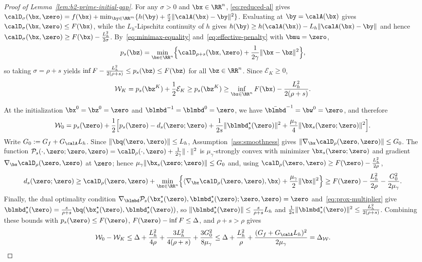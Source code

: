 \begin{proof}[Proof of Lemma~\ref{lem:b2-prime-initial-gap}]
For any \(\sigma>0\) and \(\bx\in\RR^n\), \eqref{eq:reduced-al} gives
\(\calD_\sigma(\bx,\zero)=f(\bx)+\min_{\by\in\RR^m}\{h(\by)
+\frac{\sigma}{2}\|\calA(\bx)-\by\|^2\}\). Evaluating at \(\by=\calA(\bx)\)
gives \(\calD_\sigma(\bx,\zero)\le F(\bx)\), while the \(L_h\)-Lipschitz
continuity of \(h\) gives \(h(\by)\ge h(\calA(\bx))-L_h\|\calA(\bx)-\by\|\) and
hence \(\calD_\sigma(\bx,\zero)\ge F(\bx)-\frac{L_h^2}{2\sigma}\).
By~\eqref{eq:minimax-equality} and~\eqref{eq:effective-penalty} with
\(\bmu=\zero\),
\[
    p_s(\bz)
    =\min_{\bx\in\RR^n}\Bigl\{\calD_{\rho+s}(\bx,\zero)
    +\frac{1}{2\gamma}\|\bx-\bz\|^2\Bigr\},
\]
so taking \(\sigma=\rho+s\) yields
\(\inf F-\frac{L_h^2}{2(\rho+s)}\le p_s(\bz)\le F(\bz)\) for all
\(\bz\in\RR^n\). Since \(\mathcal E_K\ge0\),
\[
    \mathcal W_K=p_s(\bz^K)+\frac12\mathcal E_K
    \ge p_s(\bz^K)
    \ge\inf_{\bx\in\RR^n}F(\bx)-\frac{L_h^2}{2(\rho+s)} .
\]

At the initialization \(\bx^0=\bz^0=\zero\) and
\(\blmbd^{-1}=\blmbd^0=\zero\), we have \(\bar{\blmbd}^{-1}=\bw^0=\zero\), and
therefore
\[
    \mathcal W_0=p_s(\zero)+\frac12\Bigl[
    p_s(\zero)-d_s(\zero;\zero)
    +\frac{1}{2s}\|\blmbd_s^\star(\zero)\|^2
    +\frac{\mu_\gamma}{4}\|\bx_s(\zero;\zero)\|^2\Bigr].
\]
Write \(G_0:=G_f+G_{\calA}L_h\). Since \(\|\bq(\zero,\zero)\|\le L_h\),
Assumption~\ref{ass:smoothness} gives
\(\|\nabla_{\bx}\calD_\rho(\zero,\zero)\|\le G_0\). The function
\(\mathcal P_s(\cdot,\zero;\zero,\zero)
=\calD_\rho(\cdot,\zero)+\frac{1}{2\gamma}\|\cdot\|^2\) is
\(\mu_\gamma\)-strongly convex with minimizer \(\bx_s(\zero;\zero)\) and
gradient \(\nabla_{\bx}\calD_\rho(\zero,\zero)\) at \(\zero\); hence
\(\mu_\gamma\|\bx_s(\zero;\zero)\|\le G_0\) and, using
\(\calD_\rho(\zero,\zero)\ge F(\zero)-\frac{L_h^2}{2\rho}\),
\[
    d_s(\zero;\zero)
    \ge\calD_\rho(\zero,\zero)
    +\min_{\bx\in\RR^n}\Bigl\{\langle\nabla_{\bx}\calD_\rho(\zero,\zero),\bx\rangle
    +\frac{\mu_\gamma}{2}\|\bx\|^2\Bigr\}
    \ge F(\zero)-\frac{L_h^2}{2\rho}-\frac{G_0^2}{2\mu_\gamma} .
\]
Finally, the dual optimality condition
\(\nabla_{\blmbd}\mathcal P_s(\bx_s^\star(\zero),\blmbd_s^\star(\zero);\zero,\zero)=\zero\)
and~\eqref{eq:prox-multiplier} give
\(\blmbd_s^\star(\zero)=\frac{s}{\rho+s}\bq(\bx_s^\star(\zero),\blmbd_s^\star(\zero))\),
so \(\|\blmbd_s^\star(\zero)\|\le\frac{s}{\rho+s}L_h\) and
\(\frac{1}{2s}\|\blmbd_s^\star(\zero)\|^2\le\frac{L_h^2}{2(\rho+s)}\).
Combining these bounds with \(p_s(\zero)\le F(\zero)\),
\(F(\zero)-\inf F\le\Delta\), and \(\rho+s>\rho\) gives
\[
    \mathcal W_0-\mathcal W_K
    \le\Delta+\frac{L_h^2}{4\rho}+\frac{3L_h^2}{4(\rho+s)}
    +\frac{3G_0^2}{8\mu_\gamma}
    \le\Delta+\frac{L_h^2}{\rho}+\frac{(G_f+G_{\calA}L_h)^2}{2\mu_\gamma}
    =\Delta_{\mathcal W}.
\]
\end{proof}

